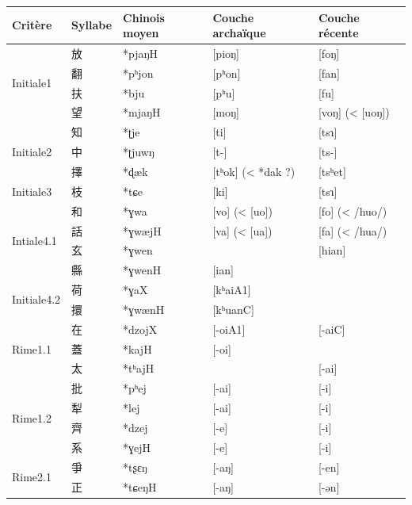 \documentclass{scrbook}
\newcounter{c}[subsubsection]
\begin{document}
\begin{sloppypar}
\begin{table}[htbp]
  \centering
    \begin{tabular}{lllll}
    \toprule
    Critère & Syllabe & Chinois moyen  & Couche archaïque & Couche récente \\
    \midrule
    \multirow{4}[2]{*}{Initiale1} & 放     & *pjaŋH & [pioŋ] & [foŋ] \\
          & 翻     & *pʰjon & [pʰon] & [fan] \\
          & 扶     & *bju  & [pʰu] & [fu] \\
          & 望     & *mjaŋH & [moŋ] & [voŋ] (< [uoŋ])  \\
    \midrule
    \multirow{3}[2]{*}{Initiale2} & 知     & *ʈje  & [ti]  & [tsɿ] \\
          & 中     & *ʈjuwŋ & [t-]  & [ts-] \\
          & 擇     & *ɖæk  & [tʰok] (< *dak ?) & [tsʰet] \\
    \midrule
    Initiale3 & 枝     & *tɕe  & [ki]  & [tsɿ] \\
    \midrule
    \multirow{4}[2]{*}{Intiale4.1} & 和     & *ɣwa  & [vo] (< [uo]) & [fo] (< /huo/) \\
          & 話     & *ɣwæjH & [va] (< [ua]) & [fa] (< /hua/) \\
          & 玄     & *ɣwen &       & [hian] \\
          & 縣     & *ɣwenH & [ian] &  \\
    \midrule
    \multirow{2}[2]{*}{Initiale4.2} & 荷     & *ɣaX  & [kʰaiA1] &  \\
          & 擐     & *ɣwænH & [kʰuanC] &  \\
    \midrule
    \multirow{3}[2]{*}{Rime1.1} & 在     & *dzojX & [-oiA1] & [-aiC] \\
          & 蓋     & *kajH & [-oi] &  \\
          & 太     & *tʰajH &       & [-ai] \\
    \midrule
    \multirow{4}[2]{*}{Rime1.2} & 批     & *pʰej & [-ai] & [-i] \\
          & 犁     & *lej  & [-ai] & [-i] \\
          & 齊     & *dzej & [-e]  & [-i] \\
          & 系     & *ɣejH & [-e]  & [-i] \\
    \midrule
    \multirow{3}[2]{*}{Rime2.1} & 爭     & *tʂɛŋ & [-aŋ] & [-en] \\
          & 正     & *tɕeŋH & [-aŋ] & [-ən] \\

\end{tabular}
\end{table}
\end{sloppypar}
\end{document}
